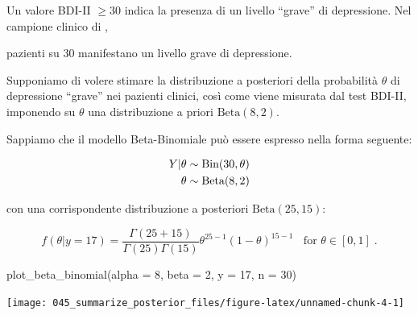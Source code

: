 \documentclass[
  11pt,
  italian,
  a4paper,
  extrafontsizes,onecolumn,openright
  ]{memoir}
\newenvironment{Shaded}{\begin{snugshade}}{\end{snugshade}}
\newcommand{\AttributeTok}[1]{\textcolor[rgb]{0.77,0.63,0.00}{#1}}
\newcommand{\CommentTok}[1]{\textcolor[rgb]{0.56,0.35,0.01}{\textit{#1}}}
\newcommand{\DecValTok}[1]{\textcolor[rgb]{0.00,0.00,0.81}{#1}}
\newcommand{\FunctionTok}[1]{\textcolor[rgb]{0.00,0.00,0.00}{#1}}
\newcommand{\NormalTok}[1]{#1}
\newcommand{\SpecialCharTok}[1]{\textcolor[rgb]{0.00,0.00,0.00}{#1}}
\begin{document}
Un valore BDI-II \(\geq 30\) indica la presenza di un livello ``grave'' di depressione. Nel campione clinico di \textcite{zetschefuture2019},

\begin{Shaded}
\end{Shaded}

 pazienti su 30 manifestano un livello grave di depressione.

Supponiamo di volere stimare la distribuzione a posteriori della probabilità \(\theta\) di depressione ``grave'' nei pazienti clinici, così come viene misurata dal test BDI-II, imponendo su \(\theta\) una distribuzione a priori \(\mbox{Beta}(8, 2)\).

Sappiamo che il modello Beta-Binomiale può essere espresso nella forma seguente:

\begin{align}
Y | \theta & \sim \mbox{Bin}(30, \theta) \notag\\
\theta & \sim \mbox{Beta}(8, 2) \notag
\end{align}

\noindent
con una corrispondente distribuzione a posteriori \(\mbox{Beta}(25, 15)\):

\begin{equation}
f(\theta | y = 17) = \frac{\Gamma(25 + 15)}{\Gamma(25)\Gamma(15)}\theta^{25-1} (1-\theta)^{15-1} \;\; \text{ for } \theta \in [0,1] \; .
\label{eq:post-beta-25-15}
\end{equation}

\begin{Shaded}
\begin{Highlighting}[]
\FunctionTok{plot\_beta\_binomial}\NormalTok{(}\AttributeTok{alpha =} \DecValTok{8}\NormalTok{, }\AttributeTok{beta =} \DecValTok{2}\NormalTok{, }\AttributeTok{y =} \DecValTok{17}\NormalTok{, }\AttributeTok{n =} \DecValTok{30}\NormalTok{)}
\end{Highlighting}
\end{Shaded}

\begin{center}\texttt{[image: 045\_summarize\_posterior\_files/figure-latex/unnamed-chunk-4-1]} \end{center}
\end{document}
